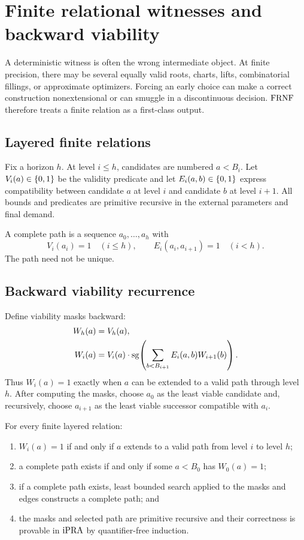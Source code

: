 \section{Finite relational witnesses and backward viability}
\label{sec:viability}

A deterministic witness is often the wrong intermediate object.  At finite precision,
there may be several equally valid roots, charts, lifts, combinatorial fillings, or
approximate optimizers.  Forcing an early choice can make a correct construction
nonextensional or can smuggle in a discontinuous decision.  \(\mathrm{FRNF}\) therefore treats
a finite relation as a first-class output.

\subsection{Layered finite relations}

Fix a horizon \(h\).  At level \(i\le h\), candidates are numbered
\(a<B_i\).  Let \(V_i(a)\in\{0,1\}\) be the validity predicate and let
\(E_i(a,b)\in\{0,1\}\) express compatibility between candidate \(a\) at level \(i\)
and candidate \(b\) at level \(i+1\).  All bounds and predicates are primitive
recursive in the external parameters and final demand.

A complete path is a sequence \(a_0,\ldots,a_h\) with
\[
  V_i(a_i)=1\quad(i\le h),
  \qquad E_i(a_i,a_{i+1})=1\quad(i<h).
\]
The path need not be unique.

\subsection{Backward viability recurrence}

Define viability masks backward:
\[
\begin{split}
 W_h(a)&=V_h(a),\\
 W_i(a)&=V_i(a)\cdot
   \operatorname{sg}\!\left(\sum_{b<B_{i+1}}E_i(a,b)W_{i+1}(b)\right).
\end{split}
\]
Thus \(W_i(a)=1\) exactly when \(a\) can be extended to a valid path through level
\(h\).  After computing the masks, choose \(a_0\) as the least viable candidate and,
recursively, choose \(a_{i+1}\) as the least viable successor compatible with
\(a_i\).

\begin{theorem}
\label{thm:backward-viability}
For every finite layered relation:
\begin{enumerate}[label=(\roman*),leftmargin=2.4em]
\item \(W_i(a)=1\) if and only if \(a\) extends to a valid path from level \(i\) to
level \(h\);
\item a complete path exists if and only if some \(a<B_0\) has \(W_0(a)=1\);
\item if a complete path exists, least bounded search applied to the masks and edges
constructs a complete path; and
\item the masks and selected path are primitive recursive and their correctness is
provable in \(\mathrm{iPRA}\) by quantifier-free induction.
\end{enumerate}
\end{theorem}

